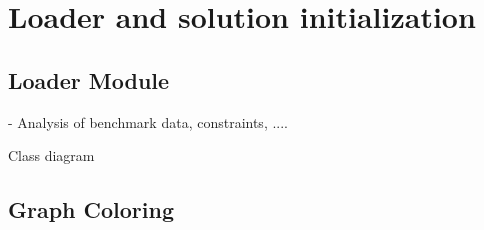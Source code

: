 \chapter{Loader and solution initialization}
\label{implementation}
\thispagestyle{plain}

\section{Loader Module}

- Analysis of benchmark data, constraints, ....

Class diagram


\section{Graph Coloring}
